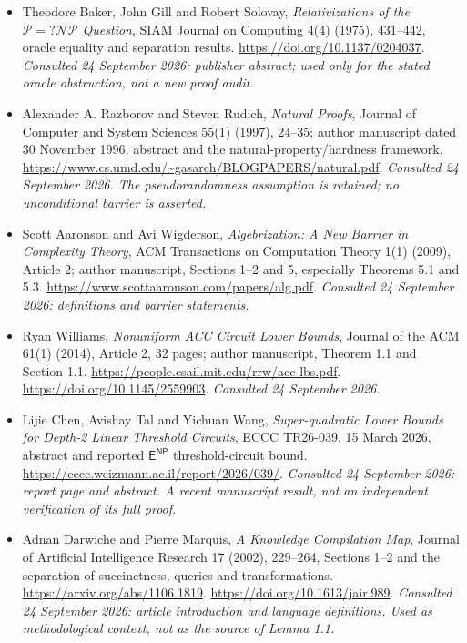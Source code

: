 \documentclass[11pt]{article}
\begin{document}
\begin{itemize}
\item[\textnormal{[E2]}]\hypertarget{extra:statement:2}{} Theodore Baker, John Gill and
Robert Solovay, \emph{Relativizations of the $\mathcal P=?\mathcal{NP}$ Question},
SIAM Journal on Computing 4(4) (1975), 431--442, oracle equality and separation
results. \url{https://doi.org/10.1137/0204037}.
{\small\textit{Consulted 24 September 2026: publisher abstract; used only for
the stated oracle obstruction, not a new proof audit.}}
\item[\textnormal{[E3]}]\hypertarget{extra:statement:3}{} Alexander A. Razborov and Steven
Rudich, \emph{Natural Proofs}, Journal of Computer and System Sciences 55(1)
(1997), 24--35; author manuscript dated 30 November 1996, abstract and the
natural-property/hardness framework.
\url{https://www.cs.umd.edu/~gasarch/BLOGPAPERS/natural.pdf}.
{\small\textit{Consulted 24 September 2026. The pseudorandomness assumption is
retained; no unconditional barrier is asserted.}}
\item[\textnormal{[E4]}]\hypertarget{extra:statement:4}{} Scott Aaronson and Avi Wigderson,
\emph{Algebrization: A New Barrier in Complexity Theory}, ACM Transactions on
Computation Theory 1(1) (2009), Article 2; author manuscript, Sections 1--2
and 5, especially Theorems 5.1 and 5.3.
\url{https://www.scottaaronson.com/papers/alg.pdf}.
{\small\textit{Consulted 24 September 2026: definitions and barrier statements.}}
\item[\textnormal{[E5]}]\hypertarget{extra:statement:5}{} Ryan Williams,
\emph{Nonuniform ACC Circuit Lower Bounds}, Journal of the ACM 61(1) (2014),
Article 2, 32 pages; author manuscript, Theorem 1.1 and Section 1.1.
\url{https://people.csail.mit.edu/rrw/acc-lbs.pdf}.
\url{https://doi.org/10.1145/2559903}.
{\small\textit{Consulted 24 September 2026.}}
\item[\textnormal{[E6]}]\hypertarget{extra:statement:6}{} Lijie Chen, Avishay Tal and
Yichuan Wang, \emph{Super-quadratic Lower Bounds for Depth-2 Linear Threshold
Circuits}, ECCC TR26-039, 15 March 2026, abstract and reported
$\mathsf E^{\mathsf{NP}}$ threshold-circuit bound.
\url{https://eccc.weizmann.ac.il/report/2026/039/}.
{\small\textit{Consulted 24 September 2026: report page and abstract. A
recent manuscript result, not an independent verification of its full proof.}}
\item[\textnormal{[E7]}]\hypertarget{extra:statement:7}{} Adnan Darwiche and Pierre
Marquis, \emph{A Knowledge Compilation Map}, Journal of Artificial Intelligence
Research 17 (2002), 229--264, Sections 1--2 and the separation of succinctness,
queries and transformations.
\url{https://arxiv.org/abs/1106.1819}.
\url{https://doi.org/10.1613/jair.989}.
{\small\textit{Consulted 24 September 2026: article introduction and language
definitions. Used as methodological context, not as the source of Lemma 1.1.}}
\end{itemize}
\end{document}
